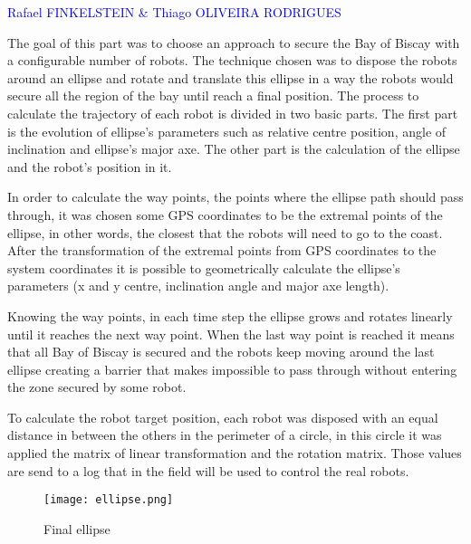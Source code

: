 \textcolor{blue} {Rafael FINKELSTEIN \& Thiago OLIVEIRA RODRIGUES}


The goal of this part was to choose an approach to secure the Bay of Biscay with a configurable number of robots. The technique chosen was to dispose the robots around an ellipse and rotate and translate this ellipse in a way the robots would secure all the region of the bay until reach a final position.  The process to calculate the trajectory of each robot is divided in two basic parts. The first part is the evolution of ellipse’s parameters such as relative centre position, angle of inclination and ellipse’s major axe. The other part is the calculation of the ellipse and the robot’s position in it.
\vspace*{0.5cm}


In order to calculate the way points, the points where the ellipse path should pass through, it was chosen some GPS coordinates to be the extremal points of the ellipse, in other words, the closest that the robots will need to go to the coast. After the transformation of the extremal points from GPS coordinates to the system coordinates it is possible to geometrically calculate the ellipse’s parameters (x and y centre, inclination angle and major axe length).
\vspace*{0.5cm}


Knowing the way points, in each time step the ellipse grows and rotates linearly until it reaches the next way point. When the last way point is reached it means that all Bay of Biscay is secured and the robots keep moving around the last ellipse creating a barrier that makes impossible to pass through without entering the zone secured by some robot.
\vspace*{0.5cm}

To calculate the robot target position, each robot was disposed with an equal distance in between the others in the perimeter of a circle, in this circle it was applied the matrix of linear transformation and the rotation matrix. Those values are send to a log that in the field will be used to control the real robots.
\vspace*{0.5cm}

\begin{figure}[!htb]
	\begin{center}
		\texttt{[image: ellipse.png]} 
		\caption{\label{Evolution of the elliptic trajectory} Final ellipse}
	\end{center}
\end{figure}

